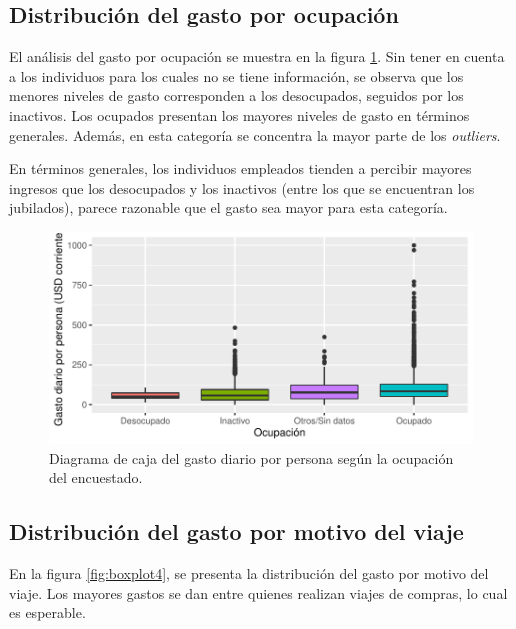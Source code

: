 \documentclass[
]{article}
\begin{document}
\hypertarget{distribuciuxf3n-del-gasto-por-ocupaciuxf3n}{%
\subsection{Distribución del gasto por
ocupación}\label{distribuciuxf3n-del-gasto-por-ocupaciuxf3n}}

El análisis del gasto por ocupación se muestra en la figura
\ref{fig:boxplot3}. Sin tener en cuenta a los individuos para los cuales
no se tiene información, se observa que los menores niveles de gasto
corresponden a los desocupados, seguidos por los inactivos. Los ocupados
presentan los mayores niveles de gasto en términos generales. Además, en
esta categoría se concentra la mayor parte de los \emph{outliers}.

En términos generales, los individuos empleados tienden a percibir
mayores ingresos que los desocupados y los inactivos (entre los que se
encuentran los jubilados), parece razonable que el gasto sea mayor para
esta categoría.

\begin{figure}[H]

{\centering \includegraphics{Informe-Proyectofinal_files/figure-latex/boxplot3-1} 

}

\caption{Diagrama de caja del gasto diario por persona según la ocupación del encuestado.}\label{fig:boxplot3}
\end{figure}

\hypertarget{distribuciuxf3n-del-gasto-por-motivo-del-viaje}{%
\subsection{Distribución del gasto por motivo del
viaje}\label{distribuciuxf3n-del-gasto-por-motivo-del-viaje}}

En la figura \ref{fig:boxplot4}, se presenta la distribución del gasto
por motivo del viaje. Los mayores gastos se dan entre quienes realizan
viajes de compras, lo cual es esperable.
\end{document}
